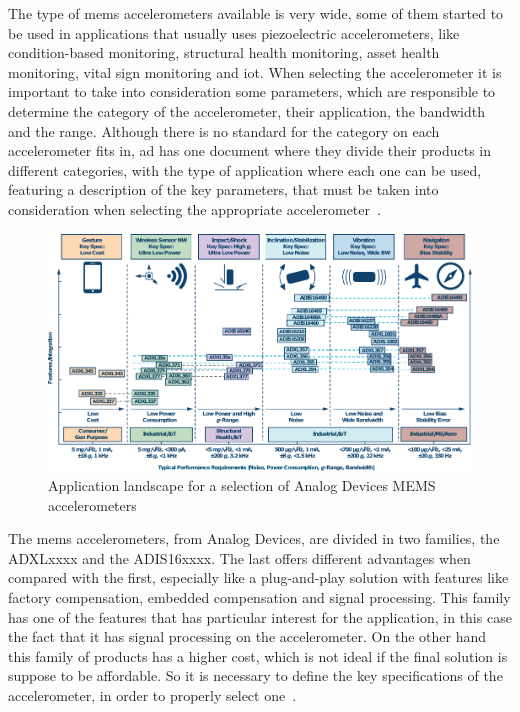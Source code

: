 The type of \acrshort{mems} accelerometers available is very wide, some of them started to be used in applications that usually uses piezoelectric accelerometers, like condition-based monitoring, structural health monitoring, asset health monitoring, vital sign monitoring and \acrshort{iot}. When selecting the accelerometer it is important to take into consideration some parameters, which are responsible to determine the category of the accelerometer, their application, the bandwidth and the range. Although there is no standard for the category on each accelerometer fits in, \acrlong{ad} has one document where they divide their products in different categories, with the type of application where each one can be used, featuring a description of the key parameters, that must be taken into consideration when selecting the appropriate accelerometer~\cite{AnalogDialogue51102017}.
\begin{figure}[]
    \centering
    \includegraphics[width=1\textwidth]{Chapters/4CHP/Figures/adTable.pdf}
    \caption{Application landscape for a selection of Analog Devices MEMS accelerometers}
    \label{fig:adtable}
\end{figure}

The \acrshort{mems} accelerometers, from Analog Devices, are divided in two families, the ADXLxxxx and the ADIS16xxxx. The last offers different advantages when compared with the first, especially like a plug-and-play solution with features like factory compensation, embedded compensation and signal processing. This family has one of the features that has particular interest for the application, in this case the fact that it has signal processing on the accelerometer. On the other hand this family of products has a higher cost, which is not ideal if the final solution is suppose to be affordable. So it is necessary to define the key specifications of the accelerometer, in order to properly select one~\cite{AnalogDialogue51102017}.

